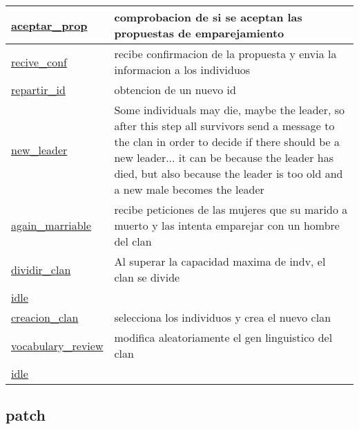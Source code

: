 \documentclass[a4paper,11pt]{article}
\begin{document}
\begin{longtable}[H!]{ll}
\midrule
\parbox{5cm}{\url{aceptar_prop}}  & \parbox{10cm}{comprobacion de si se aceptan las propuestas de emparejamiento} \\
\midrule
\parbox{5cm}{\url{recive_conf}}  & \parbox{10cm}{recibe confirmacion de la propuesta y envia la informacion a los individuos} \\
\midrule
\parbox{5cm}{\url{repartir_id}}  & \parbox{10cm}{obtencion de un nuevo id} \\
\midrule
\parbox{5cm}{\url{new_leader}}  & \parbox{10cm}{Some individuals may die, maybe the leader, so after this step all survivors send a message to the clan in order to decide 					if there should be a new leader... it can be because the leader has died, but also because the leader is too old and a new male becomes 					the leader} \\
\midrule
\parbox{5cm}{\url{again_marriable}}  & \parbox{10cm}{recibe peticiones de las mujeres que su marido a muerto y las intenta emparejar con un hombre del clan} \\
\midrule
\parbox{5cm}{\url{dividir_clan}}  & \parbox{10cm}{Al superar la capacidad maxima de indv, el clan se divide} \\
\midrule
\parbox{5cm}{\url{idle}}  & \parbox{10cm}{} \\
\midrule
\parbox{5cm}{\url{creacion_clan}}  & \parbox{10cm}{selecciona los individuos y crea el nuevo clan} \\
\midrule
\parbox{5cm}{\url{vocabulary_review}}  & \parbox{10cm}{modifica aleatoriamente el gen linguistico del clan} \\
\midrule
\parbox{5cm}{\url{idle}}  & \parbox{10cm}{} \\
\end{longtable}

\subsection{patch}
\end{document}
